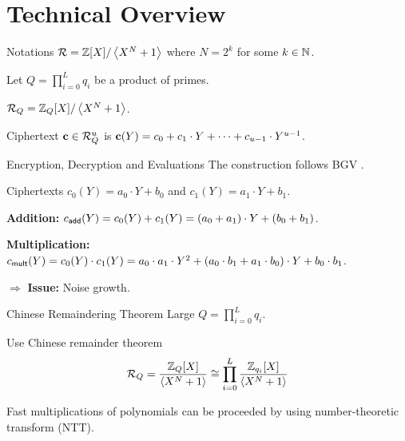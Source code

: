 \section{Technical Overview}
\begin{frame}{Notations}
	$\mathcal{R} = \mathbb{Z}[X] / \left\langle X^N + 1\right\rangle$ where $N = 2^k$ for some $k \in \mathbb{N}$.
	
	Let $Q = \prod_{i = 0}^L q_i$ be a product of primes.
	
	$\mathcal{R}_Q = \mathbb{Z}_Q[X]/ \left\langle X^N + 1\right\rangle$.
	
	Ciphertext $\mathbf{c} \in \mathcal{R}_Q^u$ is $\mathbf{c}(Y) = c_0 + c_1 \cdot Y + \dots + c_{u - 1} \cdot Y^{u-1}$.
\end{frame}

\begin{frame}{Encryption, Decryption and Evaluations}
	The construction follows BGV \cite{ITCS:BraGenVai12}.
	
	Ciphertexts $c_0(Y) = a_0\cdot Y + b_0$ and $c_1(Y) = a_1 \cdot Y + b_1$.
	
	\textbf{Addition:} $c_{\mathsf{add}}(Y) = c_0(Y) + c_1(Y) = (a_0 + a_1)\cdot Y + (b_0 + b_1)$.
	
	\textbf{Multiplication:} $c_{\mathsf{mult}}(Y) = c_0(Y)\cdot c_1(Y) = a_0\cdot a_1 \cdot Y^2 + (a_0\cdot b_1 + a_1 \cdot b_0) \cdot Y + b_0\cdot b_1$.
	
	$\Rightarrow$ \textbf{Issue:} Noise growth.
	
\end{frame}

\begin{frame}{Chinese Remaindering Theorem}
	Large $Q = \prod_{i = 0}^L q_i$.
	
	Use Chinese remainder theorem
	\begin{equation*}
		\mathcal{R}_Q = \frac{\mathbb{Z}_Q[X]}{\left\langle X^N + 1\right\rangle} \cong \prod_{i = 0}^L \frac{\mathbb{Z}_{q_i}[X]}{\left\langle X^N + 1\right\rangle}
	\end{equation*}
	
	Fast multiplications of polynomials can be proceeded by using number-theoretic transform (NTT).
\end{frame}

